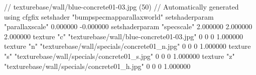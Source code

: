 // texturebase/wall/blue-concrete01-03.jpg (50)
// Automatically generated using cfgfix
setshader "bumpspecmapparallaxworld"
setshaderparam "parallaxscale" 0.000000 -0.000000
setshaderparam "specscale" 2.000000 2.000000 2.000000
texture "c" "texturebase/wall/blue-concrete01-03.jpg" 0 0 0 1.000000
texture "n" "texturebase/wall/specials/concrete01_n.jpg" 0 0 0 1.000000
texture "s" "texturebase/wall/specials/concrete01_s.jpg" 0 0 0 1.000000
texture "z" "texturebase/wall/specials/concrete01_h.jpg" 0 0 0 1.000000
